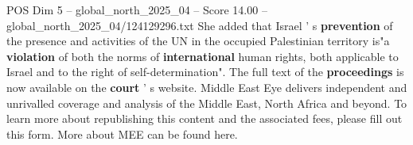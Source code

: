 \begin{textsample}{POS Dim 5 – global\_north\_2025\_04 – Score 14.00 – global\_north\_2025\_04/124129296.txt}
She added that Israel ' s \textbf{prevention} of the presence and activities of the UN in the occupied Palestinian territory is"a \textbf{violation} of both the norms of \textbf{international} human rights, both applicable to Israel and to the right of self-determination".
The full text of the \textbf{proceedings} is now available on the \textbf{court} ' s website.
Middle East Eye delivers independent and unrivalled coverage and analysis of the Middle East, North Africa and beyond.
To learn more about republishing this content and the associated fees, please fill out this form.
More about MEE can be found here.

\end{textsample}
